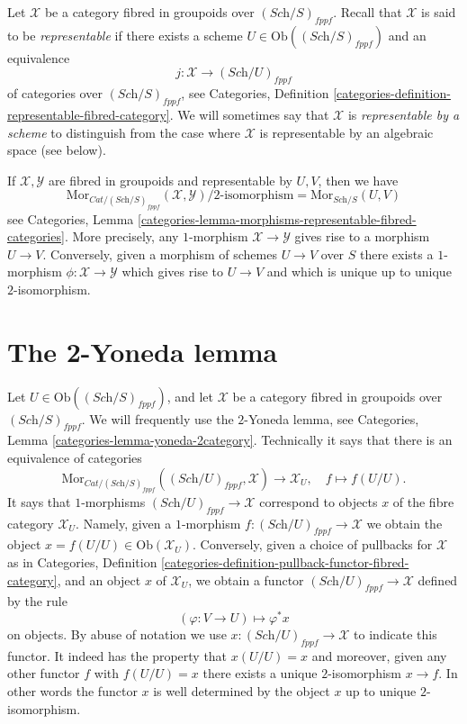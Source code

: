 \medskip\noindent
Let $\mathcal{X}$ be a category fibred in groupoids over
$(\textit{Sch}/S)_{fppf}$. Recall that $\mathcal{X}$
is said to be {\it representable} if there exists a
scheme $U \in \text{Ob}((\textit{Sch}/S)_{fppf})$ and an
equivalence
$$
j : \mathcal{X} \longrightarrow (\textit{Sch}/U)_{fppf}
$$
of categories over $(\textit{Sch}/S)_{fppf}$, see
Categories,
Definition \ref{categories-definition-representable-fibred-category}.
We will sometimes say that $\mathcal{X}$ is
{\it representable by a scheme} to distinguish from the case
where $\mathcal{X}$ is representable by an algebraic space (see
below).

\medskip\noindent
If $\mathcal{X}, \mathcal{Y}$ are fibred in groupoids and
representable by $U, V$, then we have
\begin{equation}
\label{equation-morphisms-schemes}
\text{Mor}_{\textit{Cat}/(\textit{Sch}/S)_{fppf}}(\mathcal{X}, \mathcal{Y})
\Big/
2\text{-isomorphism}
=
\text{Mor}_{\textit{Sch}/S}(U, V)
\end{equation}
see
Categories,
Lemma \ref{categories-lemma-morphisms-representable-fibred-categories}.
More precisely, any $1$-morphism $\mathcal{X} \to \mathcal{Y}$
gives rise to a morphism $U \to V$. Conversely, given a morphism
of schemes $U \to V$ over $S$ there exists a $1$-morphism
$\phi : \mathcal{X} \to \mathcal{Y}$ which gives rise to $U \to V$
and which is unique up to unique $2$-isomorphism.






\section{The 2-Yoneda lemma}
\label{section-2-yoneda}

\noindent
Let $U \in \text{Ob}((\textit{Sch}/S)_{fppf})$, and let $\mathcal{X}$ be a
category fibred in groupoids over $(\textit{Sch}/S)_{fppf}$.
We will frequently use the $2$-Yoneda lemma, see
Categories, Lemma \ref{categories-lemma-yoneda-2category}.
Technically it says that there is an equivalence of categories
$$
\text{Mor}_{\textit{Cat}/(\textit{Sch}/S)_{fppf}}(
(\textit{Sch}/U)_{fppf}, \mathcal{X})
\longrightarrow
\mathcal{X}_U, \quad
f \longmapsto f(U/U).
$$
It says that $1$-morphisms $(\textit{Sch}/U)_{fppf} \to \mathcal{X}$
correspond to objects $x$ of the fibre category $\mathcal{X}_U$.
Namely, given a $1$-morphism $f : (\textit{Sch}/U)_{fppf} \to \mathcal{X}$
we obtain the object $x = f(U/U) \in \text{Ob}(\mathcal{X}_U)$.
Conversely, given a choice of pullbacks for $\mathcal{X}$ as in
Categories,
Definition \ref{categories-definition-pullback-functor-fibred-category},
and an object $x$ of $\mathcal{X}_U$, we obtain a functor
$(\textit{Sch}/U)_{fppf} \to \mathcal{X}$ defined by the rule
$$
(\varphi : V \to U) \longmapsto \varphi^*x
$$
on objects. By abuse of notation we use
$x : (\textit{Sch}/U)_{fppf} \to \mathcal{X}$
to indicate this functor. It indeed has the property that $x(U/U) = x$
and moreover, given any other functor $f$ with $f(U/U) = x$ there exists
a unique $2$-isomorphism $x \to f$. In other words the functor $x$
is well determined by the object $x$ up to unique $2$-isomorphism.


